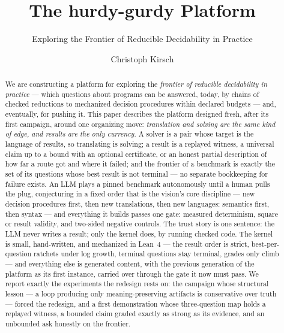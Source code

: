 \documentclass[sigplan,nonacm,10pt]{acmart}
\begin{document}
\title{The hurdy-gurdy Platform}
\subtitle{Exploring the Frontier of Reducible Decidability in Practice}

\author{Christoph Kirsch}

\begin{abstract}
We are constructing a platform for exploring the \emph{frontier of
reducible decidability in practice} --- which questions about
programs can be answered, today, by chains of checked reductions to
mechanized decision procedures within declared budgets --- and,
eventually, for pushing it. This paper describes the platform
designed fresh, after its first campaign, around one organizing
move: \emph{translation and solving are the same kind of edge, and
results are the only currency}. A solver is a pair whose target is
the language of results, so translating is solving; a result is a
replayed witness, a universal claim up to a bound with an optional
certificate, or an honest partial description of how far a route got
and where it failed; and the frontier of a benchmark is exactly the
set of its questions whose best result is not terminal --- no
separate bookkeeping for failure exists. An LLM plays a pinned
benchmark autonomously until a human pulls the plug, conjecturing in
a fixed order that is the vision's core discipline --- new decision
procedures first, then new translations, then new languages:
semantics first, then syntax --- and everything it builds passes one
gate: measured determinism, square or result validity, and two-sided
negative controls. The trust story is one sentence: the LLM never
writes a result; only the kernel does, by running checked code. The
kernel is small, hand-written, and mechanized in Lean~4 --- the
result order is strict, best-per-question ratchets under log growth,
terminal questions stay terminal, grades only climb --- and
everything else is generated content, with the previous generation
of the platform as its first instance, carried over through the gate
it now must pass. We report exactly the experiments the redesign
rests on: the campaign whose structural lesson --- a loop producing
only meaning-preserving artifacts is conservative over truth ---
forced the redesign, and a first demonstration whose three-question
map holds a replayed witness, a bounded claim graded exactly as
strong as its evidence, and an unbounded ask honestly on the
frontier.
\end{abstract}
\end{document}
